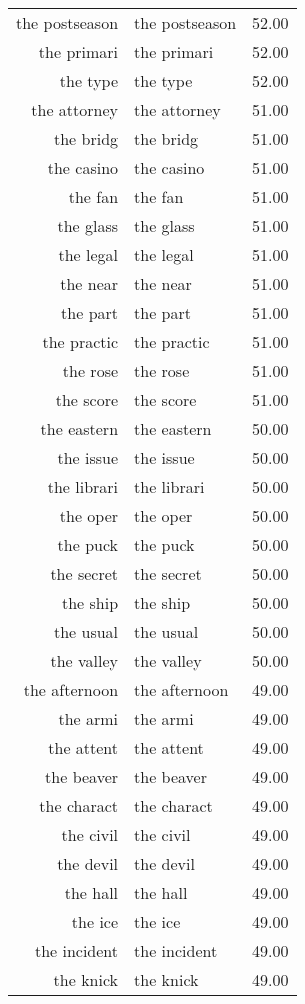 \begin{table}[ht]
\begin{tabular}{rlr}
  the postseason & the postseason & 52.00 \\ 
  the primari & the primari & 52.00 \\ 
  the type & the type & 52.00 \\ 
  the attorney & the attorney & 51.00 \\ 
  the bridg & the bridg & 51.00 \\ 
  the casino & the casino & 51.00 \\ 
  the fan & the fan & 51.00 \\ 
  the glass & the glass & 51.00 \\ 
  the legal & the legal & 51.00 \\ 
  the near & the near & 51.00 \\ 
  the part & the part & 51.00 \\ 
  the practic & the practic & 51.00 \\ 
  the rose & the rose & 51.00 \\ 
  the score & the score & 51.00 \\ 
  the eastern & the eastern & 50.00 \\ 
  the issue & the issue & 50.00 \\ 
  the librari & the librari & 50.00 \\ 
  the oper & the oper & 50.00 \\ 
  the puck & the puck & 50.00 \\ 
  the secret & the secret & 50.00 \\ 
  the ship & the ship & 50.00 \\ 
  the usual & the usual & 50.00 \\ 
  the valley & the valley & 50.00 \\ 
  the afternoon & the afternoon & 49.00 \\ 
  the armi & the armi & 49.00 \\ 
  the attent & the attent & 49.00 \\ 
  the beaver & the beaver & 49.00 \\ 
  the charact & the charact & 49.00 \\ 
  the civil & the civil & 49.00 \\ 
  the devil & the devil & 49.00 \\ 
  the hall & the hall & 49.00 \\ 
  the ice & the ice & 49.00 \\ 
  the incident & the incident & 49.00 \\ 
  the knick & the knick & 49.00 \\ 

\end{tabular}
\end{table}
